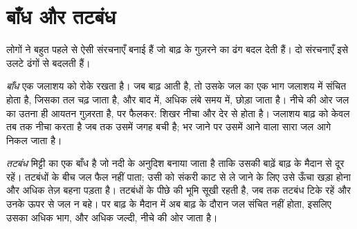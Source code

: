 \section{बाँध और तटबंध}

लोगों ने बहुत पहले से ऐसी संरचनाएँ बनाई हैं जो बाढ़ के गुज़रने का ढंग बदल देती हैं। दो संरचनाएँ
इसे उलटे ढंगों से बदलती हैं।

\emph{बाँध} एक जलाशय को रोके रखता है। जब बाढ़ आती है, तो उसके जल का एक भाग
जलाशय में संचित होता है, जिसका तल चढ़ जाता है, और बाद में,
अधिक लंबे समय में, छोड़ा जाता है। नीचे की ओर जल का उतना ही आयतन गुज़रता है, पर फैलकर:
शिखर नीचा और देर से होता है। जलाशय बाढ़ को केवल तब तक नीचा करता है जब तक
उसमें जगह बची है; भर जाने पर उसमें आने वाला सारा जल आगे निकल जाता है।

\emph{तटबंध} मिट्टी का एक बाँध है जो नदी के अनुदिश बनाया जाता है ताकि उसकी बाढ़ें
बाढ़ के मैदान से दूर रहें। तटबंधों के बीच जल फैल नहीं पाता; उसी
 को संकरी काट से ले जाने के लिए उसे ऊँचा खड़ा होना और अधिक तेज़ बहना
पड़ता है। तटबंधों के पीछे की भूमि सूखी रहती है, जब तक तटबंध टिके रहें और
उनके ऊपर से जल न बहे। पर बाढ़ के मैदान में अब बाढ़ के दौरान जल संचित नहीं होता,
इसलिए उसका अधिक भाग, और अधिक जल्दी, नीचे की ओर जाता है।

